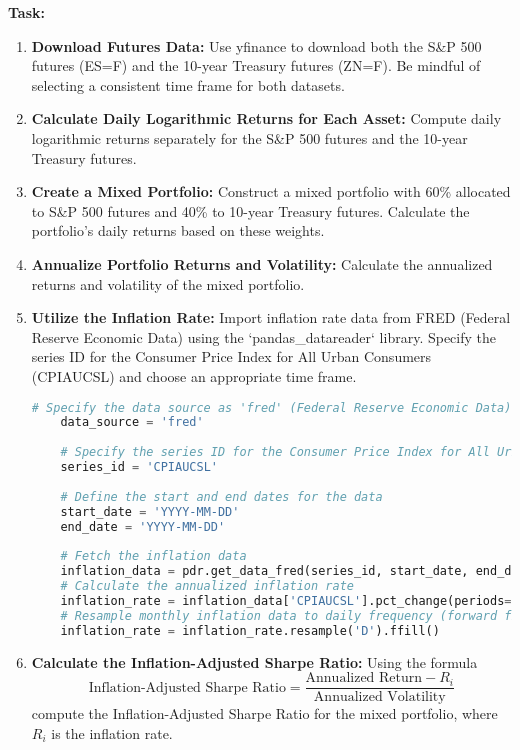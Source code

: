 \documentclass{article}
\begin{document}
\textbf{Task:}
\begin{enumerate}
    \item \textbf{Download Futures Data:} Use yfinance to download both the S\&P 500 futures (ES=F) and the 10-year Treasury futures (ZN=F). Be mindful of selecting a consistent time frame for both datasets.
    
    \item \textbf{Calculate Daily Logarithmic Returns for Each Asset:} Compute daily logarithmic returns separately for the S\&P 500 futures and the 10-year Treasury futures.
    
    \item \textbf{Create a Mixed Portfolio:} Construct a mixed portfolio with 60\% allocated to S\&P 500 futures and 40\% to 10-year Treasury futures. Calculate the portfolio's daily returns based on these weights.
    
    \item \textbf{Annualize Portfolio Returns and Volatility:} Calculate the annualized returns and volatility of the mixed portfolio.
    
    \item \textbf{Utilize the Inflation Rate:} Import inflation rate data from FRED (Federal Reserve Economic Data) using the `pandas\_datareader` library. Specify the series ID for the Consumer Price Index for All Urban Consumers (CPIAUCSL) and choose an appropriate time frame.
    
    \begin{lstlisting}[language=Python]
    # Specify the data source as 'fred' (Federal Reserve Economic Data)
    data_source = 'fred'
    
    # Specify the series ID for the Consumer Price Index for All Urban Consumers (CPIAUCSL)
    series_id = 'CPIAUCSL'
    
    # Define the start and end dates for the data
    start_date = 'YYYY-MM-DD'
    end_date = 'YYYY-MM-DD'
    
    # Fetch the inflation data
    inflation_data = pdr.get_data_fred(series_id, start_date, end_date)
    # Calculate the annualized inflation rate
    inflation_rate = inflation_data['CPIAUCSL'].pct_change(periods=12)
    # Resample monthly inflation data to daily frequency (forward fill)
    inflation_rate = inflation_rate.resample('D').ffill()
    \end{lstlisting}
    
    \item \textbf{Calculate the Inflation-Adjusted Sharpe Ratio:} Using the formula
    \begin{equation}
        \text{Inflation-Adjusted Sharpe Ratio} = \frac{\text{Annualized Return} - R_i}{\text{Annualized Volatility}}
    \end{equation}
    compute the Inflation-Adjusted Sharpe Ratio for the mixed portfolio, where \(R_i\) is the inflation rate.
    

\end{enumerate}
\end{document}
